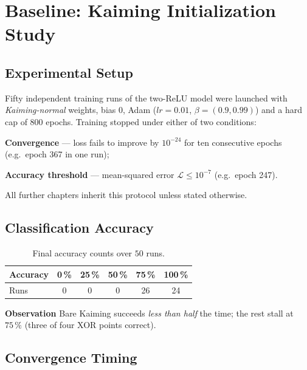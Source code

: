 
\section{Baseline: Kaiming Initialization Study}
\label{sec:relu1-kaiming}

\subsection*{Experimental Setup}
Fifty independent training runs of the two-ReLU model were launched with
\emph{Kaiming-normal} weights, bias $0$, Adam
($lr=0.01$, $\beta=(0.9,0.99)$) and a hard cap of $800$ epochs.
Training stopped under either of two conditions:
\begin{enumerate*}[label=(\roman*)]
    \item \textbf{Convergence} — loss fails to improve by
          $10^{-24}$ for ten consecutive epochs
          (e.g.\ epoch 367 in one run);
    \item \textbf{Accuracy threshold} — mean-squared error
          $\mathcal L\le10^{-7}$ (e.g.\ epoch 247).
\end{enumerate*}
All further chapters inherit this protocol unless stated otherwise.

\subsection*{Classification Accuracy}

\begin{table}[h]
\centering
\caption{Final accuracy counts over $50$ runs.}
\label{tab:relu1-kaiming-accuracy}
\begin{tabular}{lccccc}
\toprule
Accuracy & 0\,\% & 25\,\% & 50\,\% & 75\,\% & 100\,\% \\ \midrule
Runs & 0 & 0 & 0 & 26 & 24 \\ \bottomrule
\end{tabular}
\end{table}

\textbf{Observation}  
Bare Kaiming succeeds \emph{less than half} the time; the rest stall at
$75\,\%$ (three of four XOR points correct).

\subsection*{Convergence Timing}

